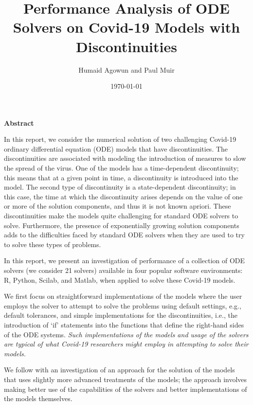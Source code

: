 \documentclass{article}
\begin{document}
\begin{titlepage}
\author{Humaid Agowun and Paul Muir} 
\title{Performance Analysis of ODE Solvers on Covid-19 Models with Discontinuities 
} 
\date{\today} 
\maketitle
\end{titlepage}

\begin{center}
    \textbf{Abstract}
\end{center}

In this report, we consider the numerical solution of two challenging
Covid-19 ordinary differential equation (ODE) 
models that have discontinuities. 
The discontinuities are associated with modeling
the introduction of measures to slow the spread of the virus.
One of the models has a 
time-dependent discontinuity; this means that at a given point in time, a discontinuity is introduced
into the model. The second type of discontinuity is a state-dependent discontinuity;
in this case, the time at which the discontinuity arises depends on the
value of one or more of the solution components, and thus it is not known apriori.
These discontinuities make the models quite challenging for standard ODE solvers to solve.
Furthermore, the presence of exponentially growing solution components adds 
to the difficulties faced by standard ODE solvers when they are used to try to solve these types of 
problems.

In this report, we present an investigation of performance of a collection of ODE solvers (we
consider 21 solvers) available in four popular software environments: R, Python, 
Scilab, and Matlab, when applied to solve these Covid-19 models.

We first focus on straightforward implementations of the models 
where the user employs the solver to attempt to solve the problems using default settings, e.g., default tolerances, and simple implementations for the
discontinuities, i.e., the introduction of `if' statements into the functions that 
define the right-hand sides of the ODE systems. {\it Such implementations of the models
and usage of the solvers are typical of what Covid-19 researchers might employ 
in attempting to solve their models.}

We follow with an investigation of an approach for the solution of the models that uses slightly more
advanced treatments of the models; the approach 
involves making better use of the capabilities of the solvers and 
better implementations of the models themselves.
\end{document}
